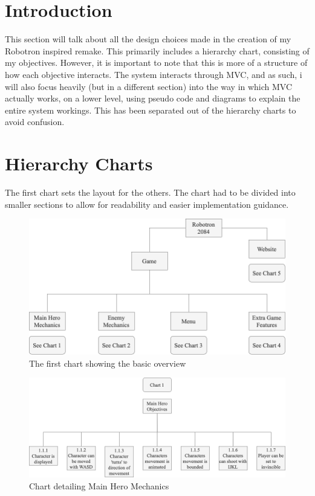 \section{Introduction}
This section will talk about all the design choices made in the creation of my Robotron inspired remake. This primarily includes a hierarchy chart, consisting of my objectives. However, it is important to note that this is more of a structure of how each objective interacts. The system interacts through MVC, and as such, i will also focus heavily (but in a different section) into the way in which MVC actually works, on a lower level, using pseudo code and diagrams to explain the entire system workings. This has been separated out of the hierarchy charts to avoid confusion.

\section{Hierarchy Charts}
The first chart sets the layout for the others. The chart had to be divided into smaller sections to allow for readability and easier implementation guidance. 

\begin{figure}[H]
  \includegraphics[width=0.8\linewidth]{Figures/chart0.png}
  \centering
  \caption{The first chart showing the basic overview}
  \label{fig:Chart_0}
\end{figure}

\begin{figure}[H]
  \includegraphics[width=1\linewidth]{Figures/chart1.png}
  \centering
  \caption{Chart detailing Main Hero Mechanics}
  \label{fig:Chart_1}
\end{figure}


